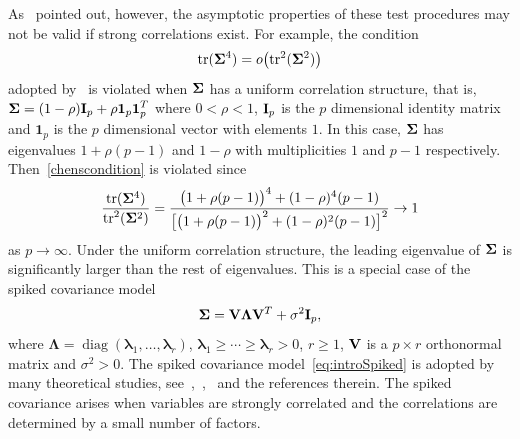 \documentclass[review]{elsarticle}
\DeclareMathOperator{\mytr}{tr}
\DeclareMathOperator{\mydiag}{diag}
\newcommand{\bfsym}[1]{\ensuremath{\boldsymbol{#1}}}
\def\blambda {\bfsym {\lambda}}        \def\bLambda {\bfsym {\Lambda}}
\theoremstyle{plain}
\theoremstyle{definition}
\theoremstyle{remark}
\begin{document}
As~\cite{Ma2015A} pointed out, however, the asymptotic properties of these test procedures may not be valid if strong correlations exist. For example, the condition 
\begin{equation}\label{chenscondition}
    \mathrm{tr}(\bSigma^4)=o\big(\mathrm{tr}^2(\bSigma^2)\big)
\end{equation}
adopted by~\cite{Chen2010A} is violated when $\bSigma$ has a uniform correlation structure, that is, $\bSigma=(1-\rho)\BI_p+\rho\textbf{1}_p \textbf{1}_p^T$ where $0<\rho<1$, $\mathbf{I}_p$ is the $p$ dimensional identity matrix and $\bm{1}_p$ is the $p$ dimensional vector  with elements $1$.
In this case, $\bSigma$ has eigenvalues $1+\rho(p-1) $ and $1-\rho$ with multiplicities $1$ and $p-1$ respectively. Then~\eqref{chenscondition} is violated since 
$$
\frac{\mytr (\bSigma^4)}{\mytr^2(\bSigma^2)}=\frac{\big(1+\rho(p-1)\big)^4 + (1-\rho)^4 (p-1)}{\big[ \big(1+\rho(p-1)\big)^2+(1-\rho)^2 (p-1) \big]^2}\to 1
$$
as $p\to \infty$.
  Under the uniform correlation structure, the leading eigenvalue of $\bSigma$ is significantly larger than the rest of eigenvalues.
  This is a special case of the spiked covariance model
 \begin{equation}\label{eq:introSpiked}
 \bSigma =\BV\bLambda \BV^T +\sigma^2 \BI_p,
 \end{equation}
 where $\bLambda=\mydiag(\blambda_1,\ldots,\blambda_r)$, $\blambda_1\geq \cdots\geq \blambda_r>0$, $r\geq 1$, $\mathbf{V}$ is a $p\times r$ orthonormal matrix and $\sigma^2>0$.
The spiked covariance model~\eqref{eq:introSpiked} is adopted by many theoretical studies, see~\cite{Cai2012Sparse},~\cite{Birnbaum2013},~\cite{Passemier2015} and the references therein.
The spiked covariance arises when variables are strongly correlated and the correlations are determined by a small number of factors.
\end{document}
